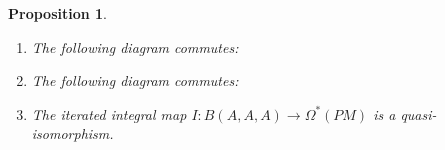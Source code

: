 \documentclass{scrartcl}
\theoremstyle{plain}
\newtheorem{proposition}[theorem]{Proposition}
\theoremstyle{definition}
\begin{document}
\begin{proposition}\label{thm:path-models-0}
    \begin{enumerate}
    \item The following diagram commutes: 
    \begin{center}
    \end{center}
    \item The following diagram commutes:
    \begin{center}
    \end{center}
    \item The iterated integral map $I\colon B(A, A, A)\to \Omega^*(PM)$ is a quasi-isomorphism. 
\end{enumerate}
\end{proposition}
\end{document}
